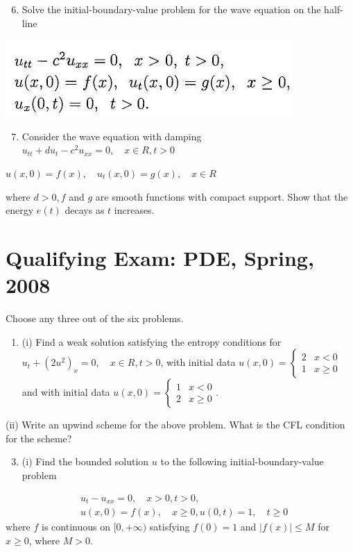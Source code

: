 \documentclass[10pt]{article}
\begin{document}
\begin{enumerate}
  \setcounter{enumi}{5}
  \item Solve the initial-boundary-value problem for the wave equation on the half-line
\end{enumerate}
\includegraphics[max width=\textwidth]{2022_05_24_3cb84f0d9d0ada46d202g-37}

\begin{enumerate}
  \setcounter{enumi}{6}
  \item Consider the wave equation with damping $u_{t t}+d u_{t}-c^{2} u_{x x}=0, \quad x \in R, t>0$
\end{enumerate}
$u(x, 0)=f(x), \quad u_{t}(x, 0)=g(x), \quad x \in R$

where $d>0, f$ and $g$ are smooth functions with compact support. Show that the energy $e(t)$ decays as $t$ increases.

\section{Qualifying Exam: PDE, Spring, 2008}
Choose any three out of the six problems.

\begin{enumerate}
  \item (i) Find a weak solution satisfying the entropy conditions for $u_{t}+\left(2 u^{2}\right)_{x}=0, \quad x \in R, t>0$, with initial data $u(x, 0)= \begin{cases}2 & x<0 \\ 1 & x \geq 0\end{cases}$ and with initial data $u(x, 0)=\left\{\begin{array}{ll}1 & x<0 \\ 2 & x \geq 0\end{array}\right.$.
\end{enumerate}
(ii) Write an upwind scheme for the above problem. What is the CFL condition for the scheme?

\begin{enumerate}
  \setcounter{enumi}{2}
  \item (i) Find the bounded solution $u$ to the following initial-boundary-value problem
\end{enumerate}
$$
\begin{aligned}
&u_{t}-u_{x x}=0, \quad x>0, t>0, \\
&u(x, 0)=f(x), \quad x \geq 0, u(0, t)=1, \quad t \geq 0
\end{aligned}
$$
where $f$ is continuous on $[0,+\infty)$ satisfying $f(0)=1$ and $|f(x)| \leq M$ for $x \geq 0$, where $M>0$.
\end{document}
